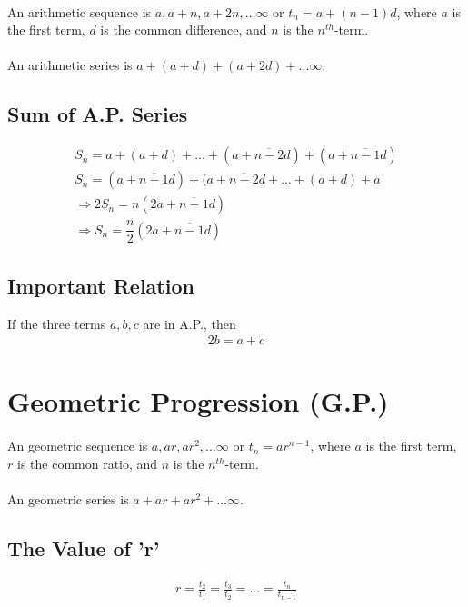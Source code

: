 \documentclass[openany, oneside]{book}
\begin{document}
\paragraph{}An arithmetic sequence is $a,a+n,a+2n,...\infty$ or $t_n=a+(n-1)d$, where $a$ is the first term, $d$ is the common difference, and $n$ is the $n^{th}$-term.
\paragraph{}An arithmetic series is $a+(a+d)+(a+2d)+...\infty$.
\subsection{Sum of A.P. Series}
\begin{align}
S_n=a+(a+d)+...+(a+\overline{n-2}d)+(a+\overline{n-1}d)\nonumber\\
S_n=(a+\overline{n-1}d)+(a+\overline{n-2}d+...+(a+d)+ a\nonumber\\
\Rightarrow 2S_n=n(2a+\overline{n-1}d)\nonumber\\
\Rightarrow S_n=\dfrac{n}{2}(2a+\overline{n-1}d)
\end{align}
\subsection{Important Relation}
If the three terms $a,b,c$ are in A.P., then
\begin{align}
2b=a+c
\end{align}

\section{Geometric Progression (G.P.)}
\paragraph{}An geometric sequence is $a,ar,ar^2,...\infty$ or $t_n=ar^{n-1}$, where $a$ is the first term, $r$ is the common ratio, and $n$ is the $n^{th}$-term.
\paragraph{}An geometric series is $a+ar+ar^2+...\infty$.
\subsection{The Value of 'r'}
\begin{align}
r=\frac{t_2}{t_1}=\frac{t_3}{t_2}=...=\frac{t_{n}}{t_{n-1}}
\end{align}
\end{document}
